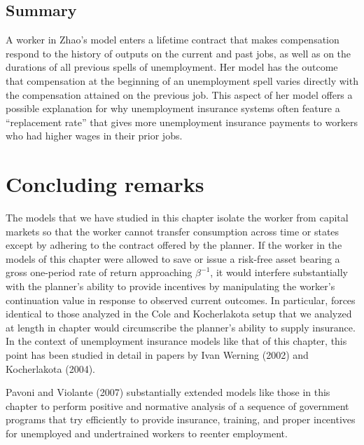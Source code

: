\subsection{Summary}
 A worker in Zhao's model enters a lifetime contract that makes
compensation respond to the history of outputs on the current and
past jobs, as well as on the durations of all previous spells of
unemployment.
Her model has the outcome that compensation at the beginning
of an unemployment spell varies directly with the compensation
attained on the previous job.
   This aspect of her model offers a possible explanation for why
unemployment insurance systems often feature a ``replacement rate''
that gives more unemployment insurance payments to workers
who had higher wages in their prior jobs.


\section{Concluding remarks}

  The models that we have studied in this chapter isolate the worker
from capital markets so that the worker
cannot   transfer consumption across time
or states except by adhering to the contract offered by the planner.
If the worker in the models of this chapter
were allowed to save or issue a risk-free asset bearing
a gross one-period rate of return approaching $\beta^{-1}$, it would
interfere substantially with
the planner's ability to provide incentives by manipulating
 the worker's continuation value in response to observed current outcomes.
In particular, forces identical to those analyzed
 in the Cole and Kocherlakota setup that we analyzed at length
in chapter  would circumscribe the planner's
ability to supply insurance.
In the context of unemployment insurance models like that of this chapter,
  this   point has been studied in detail
in papers by Ivan Werning (2002) and Kocherlakota (2004).
  

Pavoni and Violante (2007) substantially extended models like those in this chapter to perform
positive and normative analysis of a sequence of government programs  that try efficiently to provide insurance, training, and  proper incentives
for unemployed and undertrained workers to reenter employment.
%
%

